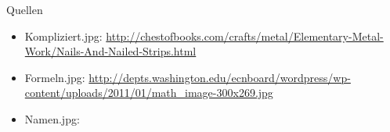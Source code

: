 \begin{frame}{Quellen}

\begin{itemize}
\item Kompliziert.jpg: 
\url{http://chestofbooks.com/crafts/metal/Elementary-Metal-Work/Nails-And-Nailed-Strips.html}
\item Formeln.jpg: 
\url{http://depts.washington.edu/ecnboard/wordpress/wp-content/uploads/2011/01/math_image-300x269.jpg}
\item Namen.jpg: 
\end{itemize}

\end{frame}
